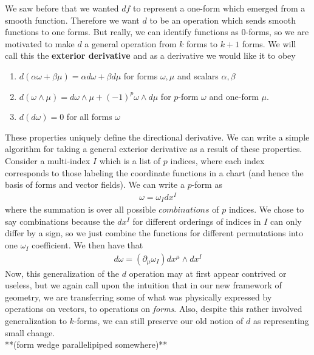 We saw before that we wanted $df$ to represent a one-form which emerged from a smooth function.  Therefore we want $d$ to be an operation which sends smooth functions to one forms.  But really, we can identify functions as 0-forms, so we are motivated to make $d$ a general operation from $k$ forms to $k+1$ forms.  We will call this the \textbf{exterior derivative} and as a derivative we would like it to obey
\begin{enumerate}
	\item $d(\alpha\omega+\beta\mu) = \alpha d\omega+\beta d\mu$ for forms $\omega, \mu$ and scalars $\alpha, \beta$
	\item $d(\omega\wedge \mu) =  d\omega \wedge \mu +(-1)^p\omega\wedge d\mu$ for $p$-form $\omega$ and one-form $\mu$.
	\item $d(d\omega) = 0$ for all forms $\omega$
\end{enumerate}
These properties uniquely define the directional derivative.  We can write a simple algorithm for taking a general exterior derivative as a result of these properties.  Consider a multi-index $I$ which is a list of $p$ indices, where each index corresponds to those labeling the coordinate functions in a chart (and hence the basis of forms and vector fields).   We can write a $p$-form as 
\begin{align*}
	\omega = \omega_I dx^I
\end{align*} 
where the summation is over all possible $\textit{combinations}$ of $p$ indices.  We chose to say combinations because the $dx^I$ for different orderings of indices in $I$ can only differ by a sign, so we just combine the functions for different permutations into one $\omega_I$ coefficient.  We then have that 
\begin{align*}
	d\omega = (\partial_\mu \omega_I)dx^\mu \wedge dx^I
\end{align*} 
Now, this generalization of the $d$ operation may at first appear contrived or useless, but we again call upon the intuition that in our new framework of geometry, we are transferring some of what was physically expressed by operations on vectors, to operations on \textit{forms}.  Also, despite this rather involved generalization to $k$-forms, we can still preserve our old notion of $d$ as representing small change.  \\

**(form wedge parallelipiped somewhere)**\\


